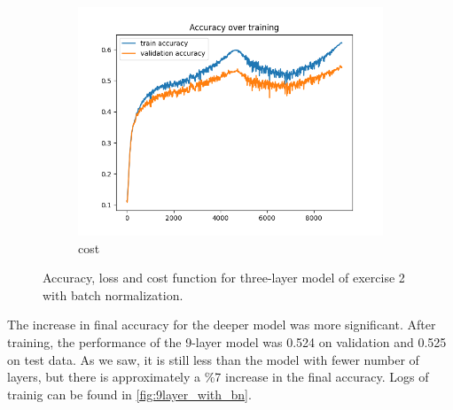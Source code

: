 \documentclass[a4paper]{article}
\begin{document}
\begin{figure}[h]
\begin{subfigure}{0.3\textwidth}
		\includegraphics[width=\linewidth]{images/ex2_with_batch_acc.png}
		\caption{cost}
	\end{subfigure}
	\caption{Accuracy, loss and cost function for three-layer model of exercise 2 with batch normalization.}
	\label{fig:3layer_with_bn}
\end{figure}

The increase in final accuracy for the deeper model was more significant. After training, the performance of the 9-layer model was 0.524 on validation and 0.525 on test data. As we saw, it is still less than the model with fewer number of layers, but there is approximately a \%7 increase in the final accuracy. Logs of trainig can be found in \autoref{fig:9layer_with_bn}.
\end{document}
